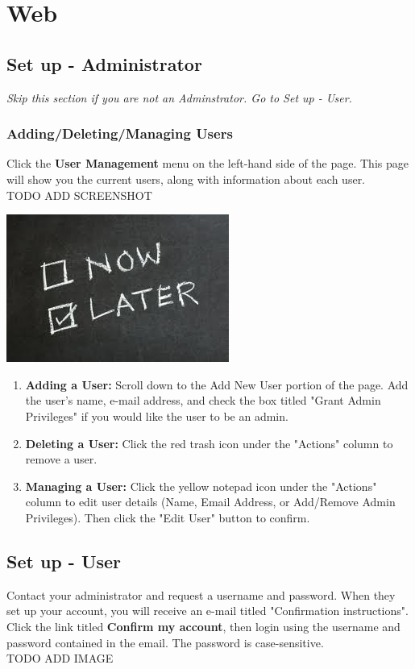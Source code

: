   \section{Web}
  \subsection{Set up - Administrator}
  \emph{Skip this section if you are not an Adminstrator. Go to Set up - User.}\\
  \subsubsection{Adding/Deleting/Managing Users}
    Click the \textbf{User Management} menu on the left-hand side of the page.  This page will
      show you the current users, along with information about each user.\\
TODO ADD SCREENSHOT
      \begin{center}
      \includegraphics[scale=1]{images/Now-Later.png}
    \end{center}  
    \begin{enumerate}
      \item \textbf{Adding a User:} Scroll down to the Add New User portion of the page.  Add the user's name, 
      e-mail address, and check the box titled "Grant Admin Privileges" if you would like the user to be an
      admin.

      \item \textbf{Deleting a User:} Click the red trash icon under the "Actions" column to remove a user.

      \item \textbf{Managing a User:} Click the yellow notepad icon under the "Actions" column to edit user 
      details (Name, Email Address, or Add/Remove Admin Privileges).  Then click the "Edit User" button to confirm.
    \end{enumerate}

  \subsection{Set up - User}
      Contact your administrator and request a username and password. When they set up your account, 
      you will receive an e-mail titled "Confirmation instructions".  Click the link titled \textbf{Confirm 
      my account}, then login using the username and password contained in the email.  The password is case-sensitive.\\
TODO ADD IMAGE

